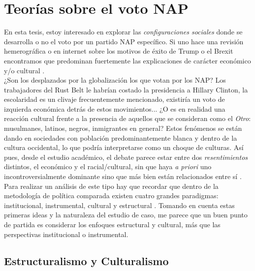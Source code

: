 \chapter{Teorías sobre el voto NAP}

En esta tesis, estoy interesado en explorar las \textit{configuraciones sociales} donde se desarrolla o no el voto por un partido NAP específico. Si uno hace una revisión hemerográfica o en internet sobre los motivos de éxito de Trump o el Brexit encontramos que predominan fuertemente las explicaciones de carácter económico y/o cultural \parencites{Beauchamp16a}{Beauchamp16b}{Carney16}{Tesler16}{Sides16} {Arnade16}.\\ 

¿Son los desplazados por la globalización los que votan por los NAP? Los trabajadores del Rust Belt le habrían costado la presidencia a Hillary Clinton, la escolaridad es un clivaje frecuentemente mencionado, existiría un voto de izquierda económica detrás de estos movimientos... ¿O es en realidad una reacción cultural frente a la presencia de aquellos que se consideran como el \textit{Otro}: musulmanes, latinos, negros, inmigrantes en general? Estos fenómenos se están dando en sociedades con población predominantemente blanca y dentro de la cultura occidental, lo que podría interpretarse como un choque de culturas. Así pues, desde el estudio académico, el debate parece estar entre dos \textit{resentimientos} distintos, el económico y el racial/cultural, sin que haya \textit{a priori} uno incontroversialmente dominante sino que más bien están relacionados entre sí \parencites{Inglehart16}{Ivarsflaten14}.\\ 

Para realizar un análisis de este tipo hay que recordar que dentro de la metodología de política comparada existen cuatro grandes paradigmas: institucional, instrumental, cultural y estructural \parencite{Uribe16}. Tomando en cuenta estas primeras ideas y la naturaleza del estudio de caso, me parece que un buen punto de partida es considerar los enfoques estructural y cultural, más que las perspectivas institucional o instrumental.\\  

\section{Estructuralismo y Culturalismo} 

